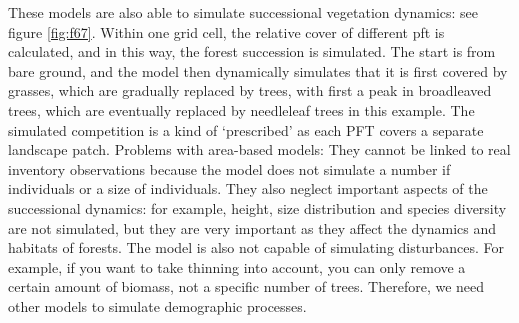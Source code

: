 \documentclass[12pt,oneside]{book}
\begin{document}
These models are also able to simulate successional vegetation dynamics:
see figure \ref{fig:f67}. Within one grid cell, the relative cover of
different pft is calculated, and in this way, the forest succession is
simulated. The start is from bare ground, and the model then dynamically
simulates that it is first covered by grasses, which are gradually
replaced by trees, with first a peak in broadleaved trees, which are
eventually replaced by needleleaf trees in this example. The simulated
competition is a kind of `prescribed' as each PFT covers a separate
landscape patch. Problems with area-based models: They cannot be linked
to real inventory observations because the model does not simulate a
number if individuals or a size of individuals. They also neglect
important aspects of the successional dynamics: for example, height,
size distribution and species diversity are not simulated, but they are
very important as they affect the dynamics and habitats of forests. The
model is also not capable of simulating disturbances. For example, if
you want to take thinning into account, you can only remove a certain
amount of biomass, not a specific number of trees. Therefore, we need
other models to simulate demographic processes.
\end{document}
